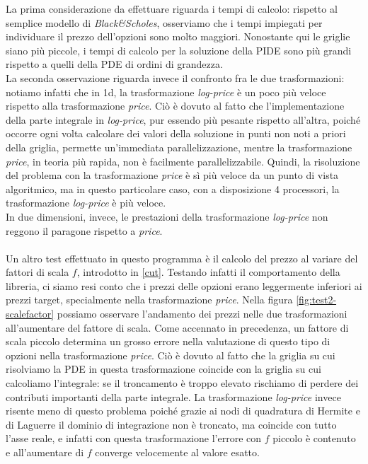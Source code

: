 \documentclass[a4paper,10pt]{report}
\theoremstyle{plain}
\theoremstyle{definition}
\theoremstyle{remark}
\begin{document}
La prima considerazione da effettuare riguarda i tempi di calcolo: rispetto al semplice modello di \emph{Black\&Scholes}, osserviamo che i tempi impiegati per individuare il prezzo dell'opzioni sono molto maggiori. Nonostante qui le griglie siano pi\`u piccole, i tempi di calcolo per la soluzione della PIDE sono pi\`u grandi rispetto a quelli della PDE di ordini di grandezza.\\La seconda osservazione riguarda invece il confronto fra le due trasformazioni: notiamo infatti che in 1d, la trasformazione \emph{log-price} \`e un poco pi\`u veloce rispetto alla trasformazione \emph{price}. Ci\`o \`e dovuto al fatto che l'implementazione della parte integrale in \emph{log-price}, pur essendo pi\`u pesante rispetto all'altra, poich\'e occorre ogni volta calcolare dei valori della soluzione in punti non noti a priori della griglia, permette un'immediata parallelizzazione, mentre la trasformazione \emph{price}, in teoria pi\`u rapida, non \`e facilmente parallelizzabile. Quindi, la risoluzione del problema con la trasformazione \emph{price} \`e s\`i pi\`u veloce da un punto di vista algoritmico, ma in questo particolare caso, con a disposizione 4 processori, la trasformazione \emph{log-price} \`e pi\`u veloce.\\In due dimensioni, invece, le prestazioni della trasformazione \emph{log-price} non reggono il paragone rispetto a \emph{price}.\\\\Un altro test effettuato in questo programma \`e il calcolo del prezzo al variare del fattori di scala $f$, introdotto in \eqref{cut}. Testando infatti il comportamento della libreria, ci siamo resi conto che i prezzi delle opzioni erano leggermente inferiori ai prezzi target, specialmente nella trasformazione \emph{price}. Nella figura \ref{fig:test2-scalefactor} possiamo osservare l'andamento dei prezzi nelle due trasformazioni all'aumentare del fattore di scala. Come accennato in precedenza, un fattore di scala piccolo determina un grosso errore nella valutazione di questo tipo di opzioni nella trasformazione \emph{price}. Ci\`o \`e dovuto al fatto che la griglia su cui risolviamo la PDE in questa trasformazione coincide con la griglia su cui calcoliamo l'integrale: se il troncamento \`e troppo elevato rischiamo di perdere dei contributi importanti della parte integrale. La trasformazione \emph{log-price} invece risente meno di questo problema poich\'e grazie ai nodi di quadratura di Hermite e di Laguerre il dominio di integrazione non \`e troncato, ma coincide con tutto l'asse reale, e infatti con questa trasformazione l'errore con $f$ piccolo \`e contenuto e all'aumentare di $f$ converge velocemente al valore esatto.
\end{document}
